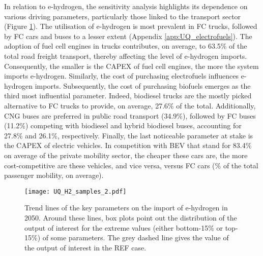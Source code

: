 In relation to e-hydrogen, the sensitivity analysis highlights its dependence on various driving parameters, particularly those linked to the transport sector (Figure \ref{fig:results_uq_samples_H2}). The utilisation of e-hydrogen is most prevalent in \gls{FC} trucks, followed by \gls{FC} cars and buses to a lesser extent (Appendix \ref{app:UQ_electrofuels}). The adoption of fuel cell engines in trucks contributes, on average, to 63.5\% of the total road freight transport, thereby affecting the level of e-hydrogen imports. Consequently, the smaller is the CAPEX of fuel cell engines, the more the system imports e-hydrogen. Similarly, the cost of purchasing electrofuels influences e-hydrogen imports. Subsequently, the cost of purchasing biofuels emerges as the third most influential parameter. Indeed, biodiesel trucks are the mostly picked alternative to \gls{FC} trucks to provide, on average, 27.6\% of the total. Additionally, \gls{CNG} buses are preferred in public road transport (34.9\%), followed by \gls{FC} buses (11.2\%) competing with biodiesel and hybrid biodiesel buses, accounting for 27.8\% and 26.1\%, respectively. Finally, the last noticeable parameter at stake is the CAPEX of electric vehicles. In competition with \gls{BEV} that stand for 83.4\% on average of the private mobility sector, the cheaper these cars are, the more cost-competitive are these vehicles, and vice versa, versus \gls{FC} cars (\% of the total passenger mobility, on average).

\begin{figure}[htbp!]
\centering
\texttt{[image: UQ\_H2\_samples\_2.pdf]}
\caption{Trend lines of the key parameters on the import of e-hydrogen in 2050. Around these lines, box plots point out the distribution of the output of interest for the extreme values (either bottom-15\% or top-15\%) of some parameters. The grey dashed line gives the value of the output of interest in the REF case. }
\label{fig:results_uq_samples_H2}
\end{figure}

